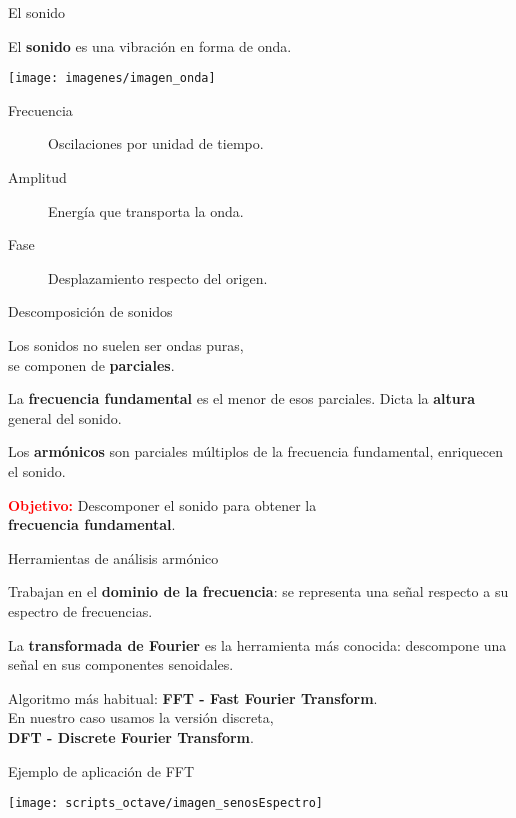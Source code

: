 \begin{frame}{El sonido}
  \begin{center}
    El \textbf{sonido} es una vibración en forma de onda.

    \bigskip
    \bigskip

    \texttt{[image: imagenes/imagen\_onda]}

    \bigskip

    \begin{description}
    \item[Frecuencia] Oscilaciones por unidad de tiempo. 
    \item[Amplitud] Energía que transporta la onda.
    \item[Fase] Desplazamiento respecto del origen.
    \end{description}
  \end{center}
\end{frame}

\begin{frame}{Descomposición de sonidos}
  \begin{center}
    Los sonidos no suelen ser ondas puras, \\se componen de \textbf{parciales}.

    \pause \bigskip
  
    La \textbf{frecuencia fundamental} es el menor de esos parciales. Dicta la
    \textbf{altura} general del sonido.

    \pause \bigskip

    Los \textbf{armónicos} son parciales múltiplos de la frecuencia fundamental,
    enriquecen el sonido.

    \pause \bigskip
  
    {\large
    \textcolor{red}{\textbf{Objetivo:}} Descomponer el sonido para obtener la \\
    \textbf{frecuencia fundamental}.}
  \end{center}
\end{frame}

\begin{frame}{Herramientas de análisis armónico}
  \begin{center}
    Trabajan en el \textbf{dominio de la frecuencia}: se representa una señal
    respecto a su espectro de frecuencias.

    \pause \bigskip

    La \textbf{transformada de Fourier} es la herramienta más conocida:
    descompone una señal en sus componentes senoidales.

    \pause \bigskip

    Algoritmo más habitual: \textbf{FFT - Fast Fourier Transform}. \\En nuestro
    caso usamos la versión discreta, \\\textbf{DFT - Discrete Fourier Transform}.

  \end{center}
\end{frame}

\begin{frame}{Ejemplo de aplicación de FFT}
  \begin{center}
    \texttt{[image: scripts\_octave/imagen\_senosEspectro]}
  \end{center}
\end{frame}



